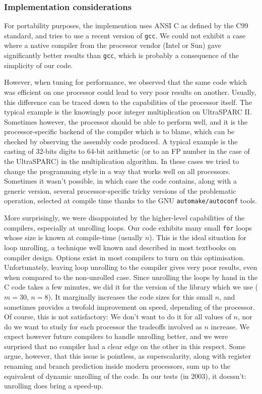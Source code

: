 \subsubsection{Implementation considerations}

For portability purposes, the implemention uses ANSI C as defined by
the C99 standard, and tries to use a recent version of \texttt{gcc}.
We could not exhibit a case where a native compiler from the processor
vendor (Intel or Sun) gave significantly better results than
\texttt{gcc}, which is probably a consequence of the simplicity of our
code.

However, when tuning for performance, we observed that the same code
which was efficient on one processor could lead to very poor results
on another.  Usually, this difference can be traced down to the
capabilities of the processor itself. The typical example is the
knowingly poor integer multiplication on UltraSPARC II. Sometimes
however, the processor should be able to perform well, and it is the
processor-specific backend of the compiler which is to blame, which
can be checked by observing the assembly code produced.  A typical
example is the casting of 32-bits digits to 64-bit arithmetic (or to
an FP number in the case of the UltraSPARC) in the multiplication
algorithm. In these cases we tried to change the programming style in
a way that works well on all processors. Sometimes it wasn't possible,
in which case the code contains, along with a generic version, several
processor-specific tricky versions of the problematic operation,
selected at compile time thanks to the GNU \texttt{automake/autoconf}
tools.


More surprisingly, we were disappointed by the higher-level
capabilities of the compilers, especially at unrolling loops. Our code
exhibits many small \texttt{for} loops whose size is known at
compile-time (usually $n$). This is the ideal situation for loop
unrolling, a technique well known and described in most textbooks on
compiler design. Options exist in most compilers to turn on this
optimisation. Unfortunately, leaving loop unrolling to the compiler
gives very poor results, even when compared to the non-unrolled case.
Since unrolling the loops by hand in the C code takes a few minutes,
we did it for the version of the library which we use ($m=30$, $n=8$).
It marginally increases the code sizes for this small $n$, and
sometimes provides a twofold improvement on speed, depending of the
processor. Of course, this is not satisfactory: We don't want to do it
for all values of $n$, nor do we want to study for each processor the
tradeoffs involved as $n$ increase. We expect however future compilers
to handle unrolling better, and we were surprised that no compiler had
a clear edge on the other in this respect. Some argue, however, that
this issue is pointless, as superscalarity, along with register
renaming and branch prediction inside modern processors, sum up to the
equivalent of dynamic unrolling of the code. In our tests (in 2003), it
doessn't: unrolling does bring a speed-up.








